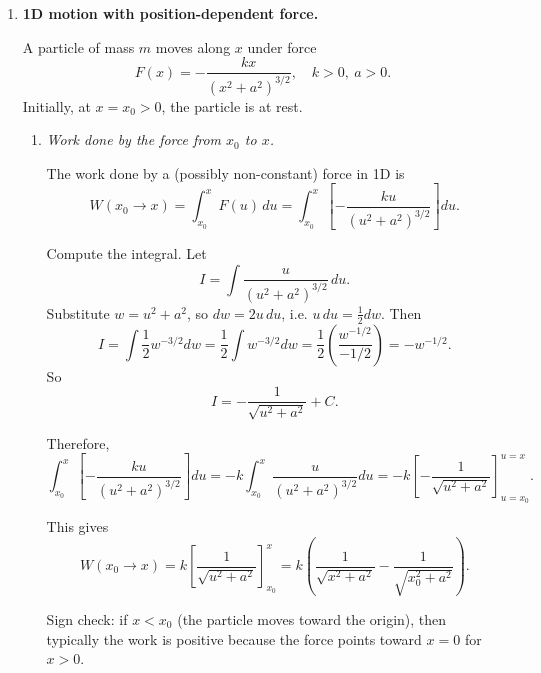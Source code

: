 \documentclass[12pt]{article}
\begin{document}
\begin{enumerate}
Writing components explicitly, if
\[
\vec{v}_0 = (v_{0x}, v_{0y}), 
\qquad
\vec{v}_p = (v_{px}, v_{py}),
\qquad
\vec{v}_b = (v_{bx}, v_{by}),
\]
then
\[
v_{bx}
= \frac{(m_b + m_c + m_p) v_{0x} - m_p v_{px}}{m_b + m_c},
\qquad
v_{by}
= \frac{(m_b + m_c + m_p) v_{0y} - m_p v_{py}}{m_b + m_c}.
\]

If the package is thrown at speed $|\vec{v}_p|$ and angle $\theta$ above the horizontal, then
\[
v_{px} = |\vec{v}_p| \cos\theta,
\qquad
v_{py} = |\vec{v}_p| \sin\theta.
\]

Physically: the boat recoils so that the center of mass of (boat+child+package) keeps the same velocity that it had just before the throw.


\item \textbf{1D motion with position-dependent force.}

A particle of mass $m$ moves along $x$ under force
\[
F(x) = - \frac{k x}{(x^2 + a^2)^{3/2}},
\quad k>0,\ a>0.
\]
Initially, at $x=x_0>0$, the particle is at rest.

\begin{enumerate}
    \item \textit{Work done by the force from $x_0$ to $x$.}

    The work done by a (possibly non-constant) force in 1D is
    \[
    W(x_0 \to x) = \int_{x_0}^{x} F(u)\,du
    = \int_{x_0}^{x} 
    \left[- \frac{k u}{(u^2 + a^2)^{3/2}} \right] du.
    \]

    Compute the integral. Let
    \[
    I = \int \frac{u}{(u^2 + a^2)^{3/2}} \, du.
    \]
    Substitute $w = u^2 + a^2$, so $dw = 2u\,du$, i.e. $u\,du = \frac{1}{2}dw$. Then
    \[
    I = \int \frac{1}{2} w^{-3/2} dw
    = \frac{1}{2} \int w^{-3/2} dw
    = \frac{1}{2} \left( \frac{w^{-1/2}}{-1/2} \right)
    = - w^{-1/2}.
    \]
    So
    \[
    I = - \frac{1}{\sqrt{u^2 + a^2}} + C.
    \]

    Therefore,
    \[
    \int_{x_0}^{x} 
    \left[- \frac{k u}{(u^2 + a^2)^{3/2}} \right] du
    = -k \int_{x_0}^{x} \frac{u}{(u^2 + a^2)^{3/2}} du
    = -k \left[ - \frac{1}{\sqrt{u^2 + a^2}} \right]_{u=x_0}^{u=x}.
    \]

    This gives
    \[
    W(x_0 \to x)
    = k \left[ \frac{1}{\sqrt{u^2 + a^2}} \right]_{x_0}^{x}
    = k \left( \frac{1}{\sqrt{x^2 + a^2}} - \frac{1}{\sqrt{x_0^2 + a^2}} \right).
    \]

    Sign check: if $x < x_0$ (the particle moves toward the origin), then typically the work is positive because the force points toward $x=0$ for $x>0$.


\end{enumerate}
\end{enumerate}
\end{document}
